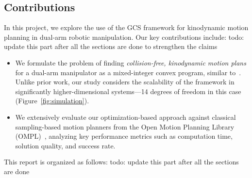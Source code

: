 \subsection{Contributions}
In this project, we explore the use of the GCS framework for kinodynamic motion planning in dual-arm robotic manipulation.
%
Our key contributions include:
{\color{red}todo: update this part after all the sections are done to strengthen the claims}
\begin{itemize}
    \item We formulate the problem of finding \textit{collision-free, kinodynamic motion plans} for a dual-arm manipulator as a mixed-integer convex program, similar to~\cite{marcucci2023motion}.
    Unlike prior work, our study considers the scalability of the framework in significantly higher-dimensional systems---14 degrees of freedom in this case (Figure~\ref{fig:simulation}).
    \item We extensively evaluate our optimization-based approach against classical sampling-based motion planners from the Open Motion Planning Library (OMPL)~\cite{sucan2012open}, analyzing key performance metrics such as computation time, solution quality, and success rate.
\end{itemize}

This report is organized as follows:
{\color{red}todo: update this part after all the sections are done}